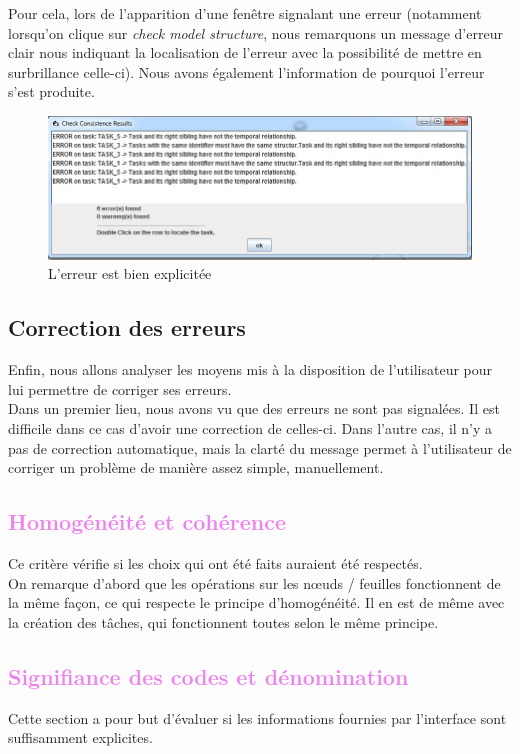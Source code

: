 \documentclass[12pt, a4paper]{article}
\begin{document}
Pour cela, lors de l'apparition d'une fenêtre signalant une erreur (notamment lorsqu'on clique sur \emph{check model structure}, nous remarquons un message d'erreur clair nous indiquant la localisation de l'erreur avec la possibilité de mettre en surbrillance celle-ci). Nous avons également l'information de pourquoi l'erreur s'est produite. %

\begin{figure}[h]
\begin{center}
   \includegraphics[scale = 0.7]{erreur.jpg}
	\caption{L'erreur est bien explicitée}
	\end{center}
\end{figure}

\textcolor{NavyBlue}{\subsection{Correction des erreurs}}
Enfin, nous allons analyser les moyens mis à la disposition de l'utilisateur pour lui permettre de corriger ses erreurs.\\


Dans un premier lieu, nous avons vu que des erreurs ne sont pas signalées. Il est difficile dans ce cas d'avoir une correction de celles-ci. Dans l'autre cas, il n'y a pas de correction automatique, mais la clarté du message permet à l'utilisateur de corriger un problème de manière assez simple, manuellement.
\textcolor{Violet}{\section{Homogénéité et cohérence}}
Ce critère vérifie si les choix qui ont été faits auraient été respectés.\\


On remarque d'abord que les opérations sur les nœuds / feuilles fonctionnent de la même façon, ce qui respecte le principe d'homogénéité. Il en est de même avec la création des tâches, qui fonctionnent toutes selon le même principe.
\newpage
\textcolor{Violet}{\section{Signifiance des codes et dénomination}}
Cette section a pour but d'évaluer si les informations fournies par l'interface sont suffisamment explicites.
\end{document}
